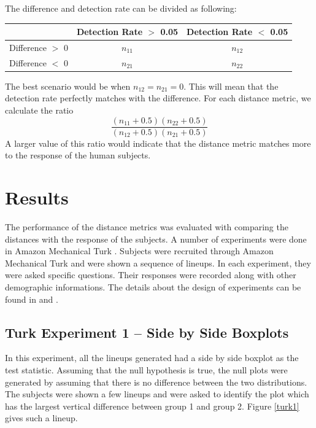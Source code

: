 \documentclass[12]{article}
\begin{document}
The difference and detection rate can be divided as following:

\begin{table}[ht]
\begin{center}
\begin{tabular}{r|cc}
\hline
 & Detection Rate $>$ 0.05 & Detection Rate $<$ 0.05\\ 
  \hline
Difference $>$ 0  & $n_{11}$ & $n_{12}$\\
Difference $<$ 0 & $n_{21}$ & $n_{22}$\\
 \hline
\end{tabular}
\end{center}
\end{table}

The best scenario would be when $n_{12} = n_{21} = 0$. This will mean that the detection rate perfectly matches with the difference.  For each distance metric, we calculate the ratio
$$ \frac{(n_{11} + 0.5)(n_{22} + 0.5)}{(n_{12} + 0.5)(n_{21} + 0.5)}$$
A larger value of this ratio would indicate that the distance metric matches more to the response of the human subjects. 




\section{Results} \label{sec:results}


The performance of the distance metrics was evaluated with comparing the distances with the response of the subjects. A number of experiments were done in Amazon Mechanical Turk \citep{turk}. Subjects were recruited through Amazon Mechanical Turk \citep{turk} and were shown a sequence of lineups. In each experiment, they were asked specific questions. Their responses were recorded along with other demographic informations. The details about the design of experiments can be found in \cite{majumder:2011} and \cite{roychowdhury:2013}. 

\subsection{Turk Experiment 1 -- Side by Side Boxplots}

In this experiment, all the lineups generated had a side by side boxplot as the test statistic. Assuming that the null hypothesis is true, the null plots were generated by assuming that there is no difference between the two distributions. The subjects were shown a few lineups and were asked to identify the plot which has the largest vertical difference between group 1 and group 2. Figure \ref{turk1} gives such a lineup. \\
\end{document}
